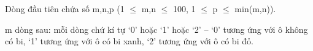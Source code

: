 Dòng đầu tiên chứa số m,n,p (1 $\le$ m,n $\le$ 100, 1 $\le$ p $\le$ min(m,n)).  

   m dòng sau: mỗi dòng chứ kí tự ‘0’ hoặc ‘1’ hoặc ‘2’ – ‘0’ tương ứng với ô không có bi, ‘1’ tương ứng với ô có bi xanh, ‘2’ tương ứng với ô có bi đỏ.  

\